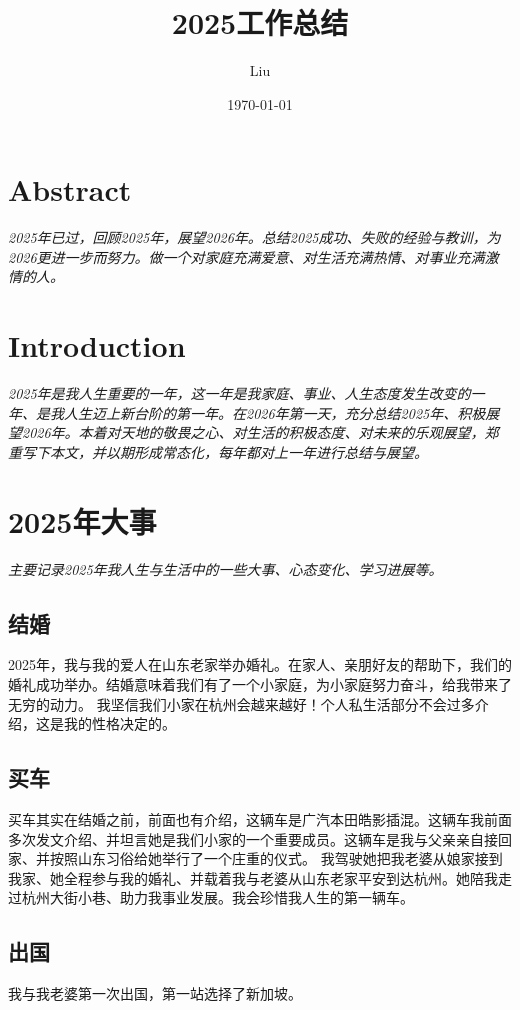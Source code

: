 \documentclass[11pt,a4paper]{article}
\begin{document}
%
\title{2025工作总结}
\author{Liu}
\date{\today}
\maketitle
\vfill
\renewcommand\abstractname{Abstract}
\section*{\abstractname}
\textit{2025年已过，回顾2025年，展望2026年。总结2025成功、失败的经验与教训，为2026更进一步而努力。做一个对家庭充满爱意、对生活充满热情、对事业充满激情的人。}\\
\thispagestyle{empty}
%
%
\tableofcontents
\thispagestyle{empty}
\cleardoublepage
{}
\newpage
%
%
\section{Introduction}
\label{sec:Einleitung}
%
\textit{2025年是我人生重要的一年，这一年是我家庭、事业、人生态度发生改变的一年、是我人生迈上新台阶的第一年。在2026年第一天，充分总结2025年、积极展望2026年。本着对天地的敬畏之心、对生活的积极态度、对未来的乐观展望，郑重写下本文，并以期形成常态化，每年都对上一年进行总结与展望。}\\

%
\section{2025年大事}
\label{sec:Grundlagen}
%
\textit{主要记录2025年我人生与生活中的一些大事、心态变化、学习进展等。}\\
\subsection{结婚}
2025年，我与我的爱人在山东老家举办婚礼。在家人、亲朋好友的帮助下，我们的婚礼成功举办。结婚意味着我们有了一个小家庭，为小家庭努力奋斗，给我带来了无穷的动力。
我坚信我们小家在杭州会越来越好！个人私生活部分不会过多介绍，这是我的性格决定的。
\subsection{买车}
买车其实在结婚之前，前面也有介绍，这辆车是广汽本田皓影插混。这辆车我前面多次发文介绍、并坦言她是我们小家的一个重要成员。这辆车是我与父亲亲自接回家、并按照山东习俗给她举行了一个庄重的仪式。
我驾驶她把我老婆从娘家接到我家、她全程参与我的婚礼、并载着我与老婆从山东老家平安到达杭州。她陪我走过杭州大街小巷、助力我事业发展。我会珍惜我人生的第一辆车。
\subsection{出国}
我与我老婆第一次出国，第一站选择了新加坡。
\end{document}
